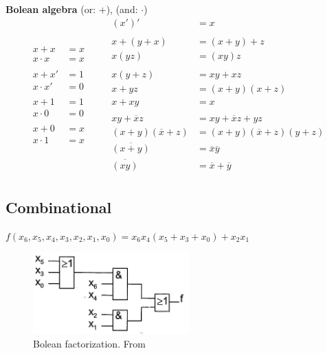 \textbf{Bolean algebra}
(or: $+$), (and: $\cdot$)
\[
\begin{aligned}
  x + x       &= x \\
  x \cdot x   &= x \\
  &\quad   \\
  x + x'      &= 1 \\
  x \cdot x'  &= 0 \\
  &\quad   \\
  x + 1       &= 1 \\
  x \cdot 0   &= 0 \\
  &\quad   \\
  x + 0       &= x \\
  x \cdot 1   &= x \\
\end{aligned} \qquad
\begin{aligned}
  (x')'       &= x \\
  &\quad   \\
  x + (y + x) &= (x +y) + z \\
  x(yz)       &= (xy)z \\
  &\quad   \\
  x(y+z)      &= xy+xz \\
  x + yz      &= (x+y)(x+z)   \\
  x + xy      &= x  \\
  &\quad   \\
  xy+\overline{x}z &= xy+\overline{x}z +yz  \\
  (x+y)(\overline{x}+z) &= (x+y)(\overline{x}+z)(y+z)   \\
  \overline{(x+y)} &= \overline{x}\overline{y}  \\
  \overline{(xy)} &= \overline{x}+\overline{y}  \\
\end{aligned}
\] 

\newpage
\subsection{Combinational}
$f(x_6,x_5,x_4,x_3,x_2,x_1,x_0) = x_6x_4(x_5+x_3+x_0) + x_2x_1$
\begin{figure}[h]
    \centering
    \includegraphics[width=6cm]{image/bolean-factorization.png}
    \caption{Bolean factorization. From \cite{}}
\end{figure}

